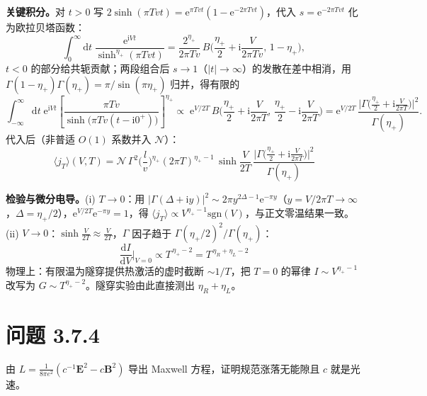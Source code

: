 \textbf{关键积分。}对 $t>0$ 写 $2\sinh(\pi Tvt)=\mathrm{e}^{\pi Tvt}(1-\mathrm{e}^{-2\pi Tvt})$，代入 $s=\mathrm{e}^{-2\pi Tvt}$ 化为欧拉贝塔函数：
\begin{equation*}
\int_0^{\infty}\mathrm{d}t\;\frac{\mathrm{e}^{\mathrm{i}Vt}}{\sinh^{\eta_+}(\pi Tvt)}
=\frac{2^{\eta_+}}{2\pi Tv}\,
B\!\Big(\frac{\eta_+}{2}+\mathrm{i}\frac{V}{2\pi Tv},\,1-\eta_+\Big),
\end{equation*}
$t<0$ 的部分给共轭贡献；两段组合后 $s\to1$（$|t|\to\infty$）的发散在差中相消，用 $\Gamma(1-\eta_+)\Gamma(\eta_+)=\pi/\sin(\pi\eta_+)$ 归并，得有限的
\begin{equation*}
\int_{-\infty}^{\infty}\mathrm{d}t\;\mathrm{e}^{\mathrm{i}Vt}
\left[\frac{\pi T v}{\sinh\big(\pi T v(t-\mathrm{i}0^{+})\big)}\right]^{\eta_+}
\propto\;\mathrm{e}^{V/2T}\,
B\!\Big(\frac{\eta_+}{2}+\mathrm{i}\frac{V}{2\pi T},\,\frac{\eta_+}{2}-\mathrm{i}\frac{V}{2\pi T}\Big)
=\mathrm{e}^{V/2T}\,
\frac{\big|\Gamma\big(\frac{\eta_+}{2}+\mathrm{i}\frac{V}{2\pi T}\big)\big|^{2}}{\Gamma(\eta_+)} .
\end{equation*}
代入后（非普适 $O(1)$ 系数并入 $\mathcal{N}$）：
\begin{equation*}
\boxed{\;\langle j_T\rangle(V,T)
=\mathcal{N}\,\Gamma^{2}\Big(\frac{l}{v}\Big)^{\eta_+}
(2\pi T)^{\eta_+-1}\,
\sinh\!\frac{V}{2T}\,
\frac{\big|\Gamma\big(\frac{\eta_+}{2}+\mathrm{i}\frac{V}{2\pi T}\big)\big|^{2}}{\Gamma(\eta_+)}\;}
\end{equation*}

\textbf{检验与微分电导。}(i) $T\to0$：用 $|\Gamma(\Delta+\mathrm{i}y)|^{2}\sim2\pi y^{2\Delta-1}\mathrm{e}^{-\pi y}$（$y=V/2\pi T\to\infty$，$\Delta=\eta_+/2$），$\mathrm{e}^{V/2T}\mathrm{e}^{-\pi y}=1$，得 $\langle j_T\rangle\propto V^{\eta_+-1}\mathrm{sgn}(V)$，与正文零温结果一致。(ii) $V\to0$：$\sinh\frac{V}{2T}\approx\frac{V}{2T}$，$\Gamma$ 因子趋于 $\Gamma(\eta_+/2)^{2}/\Gamma(\eta_+)$：
\begin{equation*}
\boxed{\;\frac{\mathrm{d}I}{\mathrm{d}V}\Big|_{V=0}
\propto T^{\,\eta_+-2}=T^{\,\eta_R+\eta_L-2}\;}
\end{equation*}
物理上：有限温为隧穿提供热激活的虚时截断 $\sim1/T$，把 $T=0$ 的幂律 $I\sim V^{\eta_+-1}$ 改写为 $G\sim T^{\eta_+-2}$。隧穿实验由此直接测出 $\eta_R+\eta_L$。

\section*{问题 3.7.4}
\begin{problem}
由 $L=\frac{1}{8\pi e^{2}}(c^{-1}\pmb{E}^{2}-c\pmb{B}^{2})$ 导出 Maxwell 方程，证明规范涨落无能隙且 $c$ 就是光速。
\end{problem}
\solution

